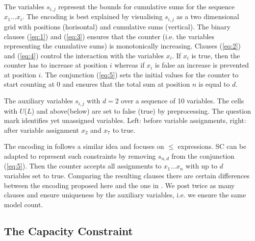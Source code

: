\documentclass[]{llncs}
\begin{document}

The variables $s_{i,j}$  represent the bounds for cumulative sums for the sequence $x_1 \ldots x_i$. The encoding is
best explained by visualising $s_{i,j}$ as a two dimensional grid with positions (horisontal) and cumulative sums
(vertical). The binary clauses (\ref{eq:1}) and (\ref{eq:3}) ensures that the counter (i.e. the variables representing
the cumulative sums) is monotonically increasing. Clauses (\ref{eq:2}) and (\ref{eq:4}) control the interaction with the
variables $x_i$. If $x_i$ is true, then the counter has to increase at position $i$ whereas if $x_i$ is false an
increase is prevented at position $i$. The conjunction (\ref{eq:5}) sets the initial values for the counter to start
counting at 0 and ensures that the total sum at position $n$ is equal to $d$. 


\begin{example}
The auxiliary variables $s_{i,j}$ with $d=2$ over a sequence of 10 variables. The cells with  $U$($L$) and
above(below) are set to false (true) by preprocessing. The question mark identifies yet unassigned variables. Left:
before variable assignments, right: after variable assignment $x_2$ and $x_7$ to true.
\begin{center}
\begin{minipage}[t]{0.5\textwidth}
%
\end{minipage}%
\begin{minipage}[t]{0.5\textwidth}
%
\end{minipage}
\end{center}
\label{ex:1}
\end{example}

The encoding in \cite{Sinz05} follows a similar idea and focuses on $\leq$ expressions. SC can be adapted to represent
such constraints by removing $s_{n,d}$ from the conjunction (\ref{eq:5}). Then the counter accepts all assignments to
$x_1 \ldots x_n$ with up to $d$ variables set to true. Comparing the resulting clauses there are certain differences
between the encoding proposed here and the one in \cite{Sinz05}. We post twice as many clauses and ensure uniqueness by
the auxiliary variables, i.e. we ensure the same model count. 

\subsection{The Capacity Constraint}
\end{document}
